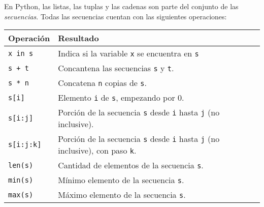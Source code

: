 \begin{sabias_que}
En Python, las listas, las tuplas y las cadenas son parte del conjunto
de las {\it secuencias}.  Todas las secuencias cuentan con las siguientes
operaciones:

\begin{tabular}{l|l}
Operación & Resultado \\
\hline
\lstinline!x in s! & Indica si la variable \lstinline!x! se encuentra en
\lstinline!s! \\
\lstinline!s + t! & Concantena las secuencias \lstinline!s! y \lstinline!t!. \\
\lstinline!s * n! & Concatena \lstinline!n! copias de \lstinline!s!. \\
\lstinline!s[i]! & Elemento \lstinline!i! de \lstinline!s!, empezando por
0. \\
\lstinline!s[i:j]! & Porción de la secuencia \lstinline!s! desde
\lstinline!i! hasta \lstinline!j! (no inclusive). \\
\lstinline!s[i:j:k]! & Porción de la secuencia \lstinline!s! desde
\lstinline!i! hasta \lstinline!j! (no inclusive), con paso \lstinline!k!.  \\
\lstinline!len(s)! & Cantidad de elementos de la secuencia \lstinline!s!.  \\
\lstinline!min(s)! & Mínimo elemento de la secuencia \lstinline!s!. \\
\lstinline!max(s)! & Máximo elemento de la secuencia \lstinline!s!. \\
\end{tabular}

\end{sabias_que}



